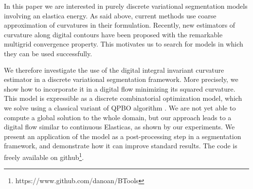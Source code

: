\documentclass[runningheads]{llncs}
\begin{document}
In this paper we are interested in purely discrete variational
segmentation models involving an elastica energy. As said above,
current methods use coarse approximation of curvatures in their
formulation.  Recently, new estimators of curvature along digital
contours have been proposed
\cite{roussillon11mdca,coeurjolly13integral,schindele17mdca} with the
remarkable multigrid convergence property. This motivates us to search
for models in which they can be used successfully.

We therefore investigate the use of the digital integral invariant
curvature estimator \cite{coeurjolly13integral} in a discrete
variational segmentation framework. More precisely, we show how to
incorporate it in a digital flow minimizing its squared
curvature. This model is expressible as a discrete combinatorial
optimization model, which we solve using a classical variant of QPBO
algorithm \cite{rother07qpbo}. We are not yet able to compute a global
solution to the whole domain, but our approach leads to a digital flow
similar to continuous Elasticas, as shown by our experiments. We
present an application of the model as a post-processing step in a
segmentation framework, and demonstrate how it can improve standard
results. The code is freely available on
github\footnote{https://www.github.com/danoan/BTools}.


\end{document}
